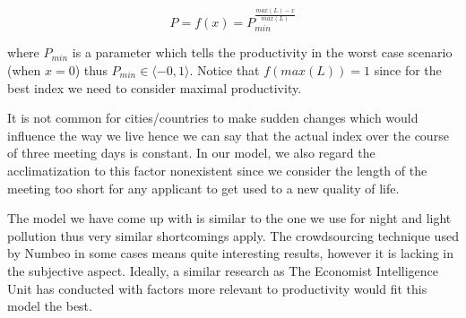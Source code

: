 $$P = f(x) = P_{min}^{\frac{max(L)-x}{max(L)}}$$

\noindent where $P_{min}$ is a parameter which tells the productivity in the worst case scenario  (when $x=0$) thus $ P_{min}\in \langle -0,1\rangle$. Notice that $f(max(L))=1$ since for the best index we need to consider maximal productivity.

It is not common for cities/countries to make sudden changes which would influence the way we live hence we can say that the actual index over the course of three meeting days is constant. In our model, we also regard the acclimatization to this factor nonexistent since we consider the length of the meeting too short for any applicant to get used to a new quality of life.


The model we have come up with is similar to the one we use for night and light pollution thus very similar shortcomings apply. The crowdsourcing technique used by Numbeo in some cases means quite interesting results, however it is lacking in the subjective aspect. Ideally, a similar research as The Economist Intelligence Unit has conducted with factors more relevant to productivity would fit this model the best. 